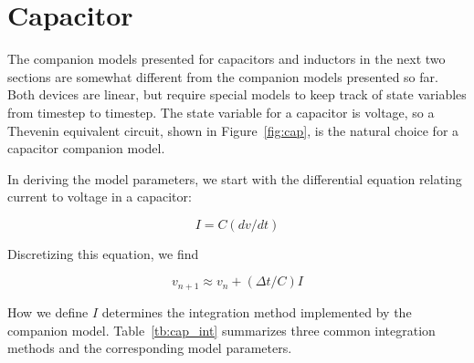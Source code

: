 \documentclass{article}
\begin{document}
\pagebreak

\section{Capacitor}

The companion models presented for capacitors and inductors in the next two sections are somewhat different from the companion models presented so far.  Both devices are linear, but require special models to keep track of state variables from timestep to timestep.  The state variable for a capacitor is voltage, so a Thevenin equivalent circuit, shown in Figure~\ref{fig:cap}, is the natural choice for a capacitor companion model.

In deriving the model parameters, we start with the differential equation relating current to voltage in a capacitor:

\begin{equation}
I=C(dv/dt)
\end{equation}

Discretizing this equation, we find

\begin{equation}
v_{n+1} \approx v_n+(\Delta t/C)I
\end{equation}

How we define $I$ determines the integration method implemented by the companion model.  Table~\ref{tb:cap_int} summarizes three common integration methods and the corresponding model parameters.

\begin{table}[h]
\centering
\caption{Capacitor companion model parameters for integration methods \label{tb:cap_int}}
\end{table}
\end{document}
